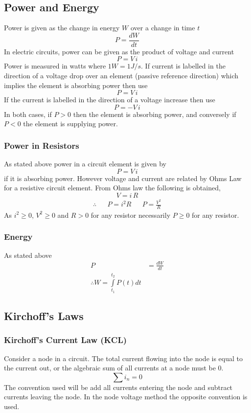 \documentclass[14pt]{article}
\begin{document}
    \subsection{Power and Energy}
    Power is given as the change in energy $W$ over a change in time $t$
    $$P=\frac{dW}{dt}$$ In electric circuits, power can be given as the
    product of voltage and current
    $$P=V\, i$$ Power is measured in watts where $1W=1J/s$. If current
    is labelled in the direction of a voltage drop over an element
    (passive reference direction) which implies the element is absorbing
    power then use
    $$P=V\, i$$ If the current is labelled in the direction of a voltage
    increase then use 
    $$P=-V\,i$$ In both cases, if $P>0$ then the element is absorbing
    power, and conversely if $P<0$ the element is supplying power.
    \subsubsection{Power in Resistors}
    As stated above power in a circuit element is given by 
    $$P=V\, i$$ if it is absorbing power. However voltage and current
    are related by Ohms Law for a resistive circuit element. From Ohms
    law the following is obtained,
    $$V=i\, R$$
    \begin{align*}
        \therefore && P=i^2R && P=\frac{V^2}{R}
    \end{align*}
    As $i^2\geq0$, $V^2\geq0$ and $R>0$ for any resistor necessarily
    $P\geq0$ for any resistor.
    \subsubsection{Energy}
    As stated above
    \begin{align*}
        P&=\frac{dW}{dt}\\
        \therefore W=\int\limits_{t_1}^{t_2}P(t)dt
    \end{align*}
    \subsection{Kirchoff's Laws}
    \subsubsection{Kirchoff's Current Law (KCL)}
    Consider a node in a circuit. The total current flowing into the
    node is equal to the current out, or the algebraic sum of all
    currents at a node must be 0.
    $$\sum i_n=0$$ The convention used will be add all currents entering
    the node and subtract currents leaving the node. In the node voltage
    method the opposite convention is used.
\end{document}
